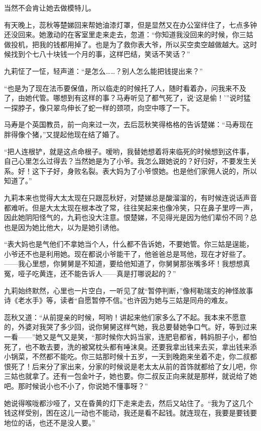 \par 当然不会肯让她去做模特儿。
\par 有天晚上，蕊秋等楚娣回来帮她油漆灯罩，但是显然又在办公室绊住了，七点多钟还没回来。她激动的在客室里走来走去，忽道：“你知道我没回来的时候，你三姑做投机，把我的钱都用掉了。也是为了救你表大爷，所以买空卖空越做越大。这时候找到个七八十块钱一个月的事，这样巴结，笑话不笑话？”
\par 九莉怔了一怔，轻声道：“是怎么……？别人怎么能把钱提出来？”
\par “也是为了现在法币要保值，所以临走的时候托了人，随时看着办，问我来不及了，由她代管。哪想到有这样的事？马寿听见了都气死了，说‘这是偷！'”说时猛一探脖子，像只翠鸟伸长了蛇一样的颈项，向空中啄了一下。
\par 马寿是个英国教员，前一向来过一次，去后蕊秋笑得格格的告诉楚娣：“马寿现在胖得像个猪，”又提起他现在结了婚了。
\par “把人连根铲，就是这点命根子。嗳哟，我替她想着将来临死的时候想到这件事，自己心里怎么过得去？当然她是为了小爷。我怎么跟她说的？好归好，不要发生关系。好！这下子好，身败名裂。表大妈为了小爷恨她。也是他们家佣人说的，所以知道了。”
\par 九莉本来也觉得大太太现在只跟蕊秋好，对楚娣总是酸溜溜的，有时候连说话声音都难听。但是大太太现在根本改了常，往往笑起来也像冷笑，只在鼻子里哼一声，因此她阴阳怪气的，九莉也没大注意。恨楚娣，不见得光是因为他们辈份不同？总也是因为她比他大，以为是她引诱他。
\par “表大妈也是气他们不拿她当个人，什么都不告诉她，不要她管。你三姑是逞能，小爷还不也是利用她。现在都说小爷能干了，他爸爸总是骂他，现在才好些了。——我心里想，你舅舅是不知道，要给他知道了，你舅舅那张嘴多坏！我想想真冤，哑子吃黄连，还不能告诉人——真是打哪说起的？”
\par 九莉始终默然，心里也一片空白，一听见了就“暂停判断，”像柯勒瑞支的神怪故事诗《老水手》等，读者“自愿暂停不信。”也许因为她与三姑是同舟的难友。
\par 蕊秋又道：“从前提亲的时候，呵哟！讲起来他们家多么了不起。我本来不愿意的，外婆对我哭了多少回，说你舅舅这样气她，我总要替她争口气。好，等到过来一看——”她又是气又是笑，“那时候你大妈当家，连肥皂都省，韩妈胆子小，都怕死了，也不敢去要，洗的被窝枕头都有唾沫臭。还要我拿出钱来去买，拿出钱来添小锅菜，不然都不能吃。你三姑那时候十五岁，一天到晚跑来坐着不走，你二叔都恨死了！后来分了家出来，分家的时候说是老太太从前的首饰就都给了女儿吧，你三姑也就拿了。还有一包金叶子，她也要。你二叔反正向来就是那样，就说给了她吧。那时候说小也不小了，你说她不懂事呀？”
\par 她说得喉咙都沙哑了，又在昏黄的灯下走来走去，然后又站住了。“我为了这几个钱这样受别，困在这儿一动也不能动，我还是看不起钱。就连现在，我要是要钱要地位的话，也还不是没人要。”
